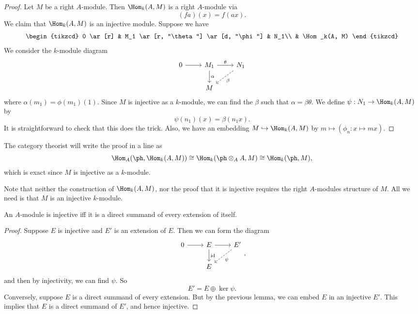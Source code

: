 \documentclass[a4paper]{article}
\begin{document}
\begin{proof}
  Let $M$ be a right $A$-module. Then $\Hom_k(A, M)$ is a right $A$-module via
  \[
    (fa)(x) = f(ax).
  \]
  We claim that $\Hom_k(A, M)$ is an injective module. Suppose we have
  \[
    \begin{tikzcd}
      0 \ar[r] & M_1 \ar[r, "\theta"] \ar[d, "\phi"] & N_1\\
      & \Hom_k(A, M)
    \end{tikzcd}
  \]
  We consider the $k$-module diagram
  \[
    \begin{tikzcd}
      0 \ar[r] & M_1 \ar[r, "\theta"] \ar[d, "\alpha"] & N_1 \ar[ld, dashed, "\beta"]\\
      & M
    \end{tikzcd}
  \]
  where $\alpha(m_1) = \phi(m_1)(1)$. Since $M$ is injective as a $k$-module, we can find the $\beta$ such that $\alpha = \beta \theta$. We define $\psi: N_1 \to \Hom_k(A, M)$ by
  \[
    \psi(n_1)(x) = \beta(n_1 x).
  \]
  It is straightforward to check that this does the trick. Also, we have an embedding $M \hookrightarrow \Hom_k(A, M)$ by $m \mapsto (\phi_n: x \mapsto mx)$.
\end{proof}
The category theorist will write the proof in a line as
\[
  \Hom_A(\ph, \Hom_k(A, M)) \cong \Hom_k(\ph \otimes_A A , M) \cong \Hom_k(\ph, M),
\]
which is exact since $M$ is injective as a $k$-module.

Note that neither the construction of $\Hom_k(A, M)$, nor the proof that it is injective requires the right $A$-modules structure of $M$. All we need is that $M$ is an injective $k$-module.

\begin{lemma}
  An $A$-module is injective iff it is a direct summand of every extension of itself.
\end{lemma}

\begin{proof}
  Suppose $E$ is injective and $E'$ is an extension of $E$. Then we can form the diagram
  \[
    \begin{tikzcd}
      0 \ar[r] & E \ar[r] \ar[d, "\mathrm{id}"] & E' \ar[dl, dashed, "\psi"]\\
      & E
    \end{tikzcd},
  \]
  and then by injectivity, we can find $\psi$. So
  \[
    E' = E \oplus \ker \psi.
  \]
  Conversely, suppose $E$ is a direct summand of every extension. But by the previous lemma, we can embed $E$ in an injective $E'$. This implies that $E$ is a direct summand of $E'$, and hence injective.
\end{proof}
\end{document}
